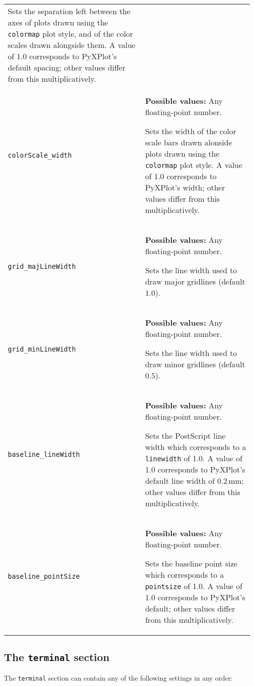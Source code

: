 \begin{longtable}{p{3.4cm}p{9cm}}
               Sets the separation left between the axes of plots drawn using the {\tt colormap} plot style, and of the color scales drawn alongside them. A value of 1.0 corresponds to PyXPlot's default spacing; other values differ from this multiplicatively.
               \\
{\tt colorScale\_width} & {\bf Possible values:} Any floating-point number.

               Sets the width of the color scale bars drawn alonside plots drawn using the {\tt colormap} plot style. A value of 1.0 corresponds to PyXPlot's width; other values differ from this multiplicatively.
               \\
{\tt grid\_majLineWidth} & {\bf Possible values:} Any floating-point number.

               Sets the line width used to draw major gridlines (default $1.0$).
               \\
{\tt grid\_minLineWidth} & {\bf Possible values:} Any floating-point number.

               Sets the line width used to draw minor gridlines (default $0.5$).
               \\
{\tt baseline\_lineWidth} & {\bf Possible values:} Any floating-point number.

               Sets the PostScript line width which corresponds to a {\tt linewidth} of 1.0. A value of 1.0 corresponds to PyXPlot's default line width of $0.2\,\mathrm{mm}$; other values differ from this multiplicatively.
               \\
{\tt baseline\_pointSize} & {\bf Possible values:} Any floating-point number.

               Sets the baseline point size which corresponds to a {\tt pointsize} of 1.0. A value of 1.0 corresponds to PyXPlot's default; other values differ from this multiplicatively.
               \\
\end{longtable}

\subsection{The {\tt terminal} section}
\label{sec:configfile_terminal}

The {\tt terminal} section can contain any of the following settings in any order:

